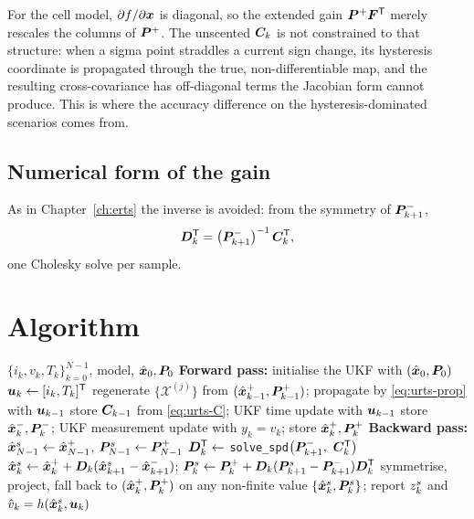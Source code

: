 \begin{remark}
For the cell model, $\partial f/\partial\bm{x}$ is diagonal, so the extended gain
$\bm{P}^+\bm{F}^{\mathsf{T}}$ merely rescales the columns of $\bm{P}^+$.  The unscented $\bm{C}_k$ is not constrained to
that structure: when a sigma point straddles a current sign change, its hysteresis coordinate is
propagated through the true, non-differentiable map, and the resulting cross-covariance has
off-diagonal terms the Jacobian form cannot produce.  This is where the accuracy difference on the
hysteresis-dominated scenarios comes from.
\end{remark}

\subsection{Numerical form of the gain}
As in Chapter~\ref{ch:erts} the inverse is avoided: from the symmetry of $\bm{P}^-_{k+1}$,
\begin{equation}
\bm{D}_k^{\mathsf{T}}=\left(\bm{P}^-_{k+1}\right)^{-1}\bm{C}_k^{\mathsf{T}} ,
\label{eq:urts-solve}
\end{equation}
one Cholesky solve per sample.

\section{Algorithm}
\begin{algorithm}[H]
\caption{Unscented RTS smoother --- whole record}
\begin{algorithmic}[1]
\Require $\{i_k,v_k,T_k\}_{k=0}^{N-1}$, model, $\hat{\bm{x}}_0,\bm{P}_0$
\State \textbf{Forward pass:} initialise the UKF with $(\hat{\bm{x}}_0,\bm{P}_0)$
   \State $\bm{u}_k\gets[i_k,T_k]^{\mathsf{T}}$
      \State regenerate $\{\mathcal{X}^{(j)}\}$ from $(\hat{\bm{x}}^{+}_{k-1},\bm{P}^+_{k-1})$; propagate by \eqref{eq:urts-prop} with $\bm{u}_{k-1}$
      \State store $\bm{C}_{k-1}$ from \eqref{eq:urts-C}; UKF time update with $\bm{u}_{k-1}$
   \EndIf
   \State store $\hat{\bm{x}}^{-}_k,\bm{P}^-_k$; UKF measurement update with $y_k=v_k$; store $\hat{\bm{x}}^{+}_k,\bm{P}^+_k$
\EndFor
\State \textbf{Backward pass:} $\hat{\bm{x}}^s_{N-1}\gets\hat{\bm{x}}^{+}_{N-1}$, $\bm{P}^s_{N-1}\gets\bm{P}^+_{N-1}$
   \State $\bm{D}_k^{\mathsf{T}}\gets$ \texttt{solve\_spd}$\left(\bm{P}^-_{k+1},\ \bm{C}_k^{\mathsf{T}}\right)$
   \State $\hat{\bm{x}}^s_k\gets\hat{\bm{x}}^{+}_k+\bm{D}_k(\hat{\bm{x}}^s_{k+1}-\hat{\bm{x}}^{-}_{k+1})$; \quad $\bm{P}^s_k\gets\bm{P}^+_k+\bm{D}_k(\bm{P}^s_{k+1}-\bm{P}^-_{k+1})\bm{D}_k^{\mathsf{T}}$
   \State symmetrise, project, fall back to $(\hat{\bm{x}}^{+}_k,\bm{P}^+_k)$ on any non-finite value
\EndFor
\Ensure $\{\hat{\bm{x}}^s_k,\bm{P}^s_k\}$; report $z^s_k$ and $\hat v_k=h(\hat{\bm{x}}^s_k,\bm{u}_k)$
\end{algorithmic}
\end{algorithm}

